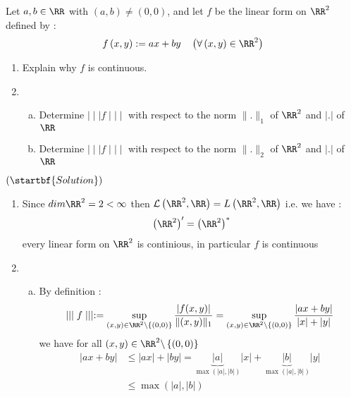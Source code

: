 \begin{example}
Let $a,b \in \RR  $ with $\left(  a,b \right) \neq  \left( 0,0 \right) $, 
and let $f $  be the linear form on $\RR ^2  $  defined by : 
\[
f \left( x,y \right) := 
ax + by \quad 
\left( \forall  \left( x,y \right) \in \RR ^2  \right)
\]
\begin{enumerate}[(1)]
\item  Explain why $f $ is continuous.
\item \begin{enumerate}[(a)]
\item   Determine $\mid \mid \mid  f \mid \mid \mid  $  
	with respect to the norm $\| . \| _{1} $  
	of $\RR ^2  $  and $\left| . \right| $  of 
	$\RR  $ 
\item Determine $\mid \mid \mid  f \mid \mid \mid  $   
	with respect to the norm $\| . \| _{2} $  
	of $\RR ^2  $  and $\left| . \right| $  of
	$\RR  $ 
\end{enumerate} 
\end{enumerate}
\begin{center}
	$ \left( \startbf{ Solution }  \right) $ 
\end{center}
\begin{enumerate}[(1)]
\item 
Since $dim \RR ^2 = 2 < \infty  $  
then $\mathcal{L} \left( \RR ^2 , \RR  \right) = L \left( \RR ^2 ,\RR  \right) $
i.e. we have :
\[
\left( \RR ^2  \right) ' = \left( \RR ^2  \right) ^{*}
\]
every linear form on $\RR ^2  $  is continious, in particular
$f $ is continuous
\item 
\begin{enumerate}[(a)]
\item  By definition : 
	\[
	\mid \mid \mid  f \mid \mid \mid  :=
	\sup_{(x,y ) \in  \RR ^2  \backslash 
	\left\{ (0,0)  \right\}}  
	\frac{\left| f(x,y)  \right|}{\| (x,y)  \| _{1}} 
	=
	\sup_{ \left( x,y \right)\in \RR ^2  \backslash  \left\{ (0,0)  \right\}} 
	\frac{\left| ax + by  \right|}{ \left| x \right|+  \left| y \right|}
	\]
	we have for all $\left(  x,y \right)\in  \RR ^2  \backslash 
	\left\{ (0,0)  \right\}$  
	\begin{align*}
	\left| ax + by \right| 
	& \leq 
	\left| ax \right| + \left| by \right| = 
	\underbrace{
		\left| a \right|
	}_{ \max  \left( \left| a \right|, \left| b \right| \right)} 
	\left| x \right| + 
	\underbrace{
	\left| b \right|
	}_{\max  \left( \left| a \right|, \left| b \right| \right)} 
	\left| y \right|
	\\
	& \leq 
	\max  \left( \left| a \right|, \left| b \right| \right) 

\end{align*}
\end{enumerate}
\end{enumerate}
\end{example}
